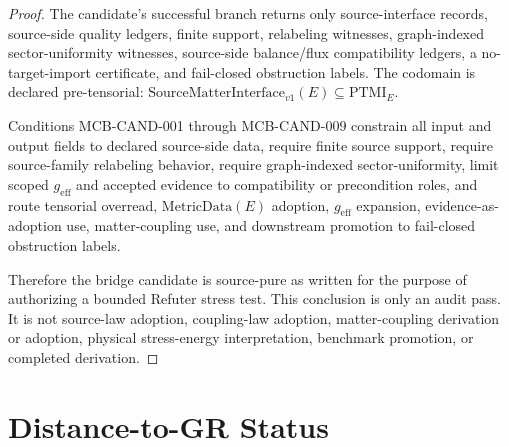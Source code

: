 \documentclass[11pt]{article}
\newcommand{\MetricData}{\mathrm{MetricData}}
\newcommand{\geff}{g_{\mathrm{eff}}}
\newcommand{\SMI}{\mathrm{SourceMatterInterface}_{v1}}
\newcommand{\PTMI}{\mathrm{PTMI}}
\begin{document}
\begin{proof}
The candidate's successful branch returns only source-interface records,
source-side quality ledgers, finite support, relabeling witnesses,
graph-indexed sector-uniformity witnesses, source-side balance/flux
compatibility ledgers, a no-target-import certificate, and fail-closed
obstruction labels. The codomain is declared pre-tensorial:
\(\SMI(E)\subseteq\PTMI_E\).

Conditions MCB-CAND-001 through MCB-CAND-009 constrain all input and output
fields to declared source-side data, require finite source support, require
source-family relabeling behavior, require graph-indexed sector-uniformity,
limit scoped \(\geff\) and accepted evidence to compatibility or precondition
roles, and route tensorial overread, \(\MetricData(E)\) adoption,
\(\geff\) expansion, evidence-as-adoption use, matter-coupling use, and
downstream promotion to fail-closed obstruction labels.

Therefore the bridge candidate is source-pure as written for the purpose of
authorizing a bounded Refuter stress test. This conclusion is only an audit
pass. It is not source-law adoption, coupling-law adoption, matter-coupling
derivation or adoption, physical stress-energy interpretation, benchmark
promotion, or completed derivation.
\end{proof}

\section{Distance-to-GR Status}
\end{document}
